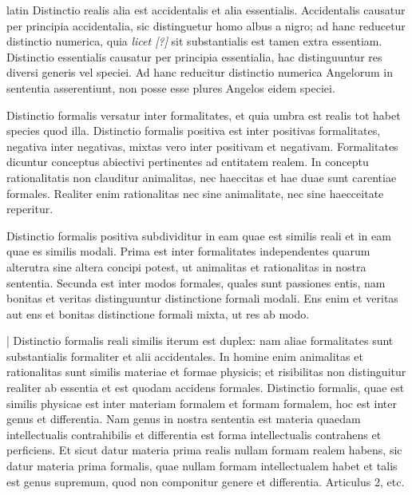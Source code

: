 \begin{otherlanguage*}{latin}
\pstart
 Distinctio realis alia est accidentalis et alia essentialis. Accidentalis causatur per principia accidentalia, sic distinguetur homo albus a nigro; ad hanc reducetur distinctio numerica, quia \emph{licet [?]} sit substantialis est tamen extra essentiam. Distinctio essentialis causatur per principia essentialia, hac distinguuntur res diversi generis vel speciei. Ad hanc reducitur distinctio numerica Angelorum in sententia asserentiunt, non posse esse plures Angelos eidem speciei. 
\pend

\pstart
 Distinctio formalis versatur inter formalitates, et quia umbra est realis tot habet species quod illa. Distinctio formalis positiva est inter positivas formalitates, negativa inter negativas, mixtas vero inter positivam et negativam. Formalitates dicuntur conceptus abiectivi pertinentes ad entitatem realem. In conceptu rationalitatis non clauditur animalitas, nec haeccitas et hae duae sunt carentiae formales. Realiter enim rationalitas nec sine animalitate, nec sine haecceitate reperitur. 
\pend

\pstart
 Distinctio formalis positiva subdividitur in eam quae est similis reali et in eam quae es similis modali. Prima est inter formalitates independentes quarum alterutra sine altera concipi potest, ut animalitas et rationalitas in nostra sententia. Secunda est inter modos formales, quales sunt passiones entis, nam bonitas et veritas distinguuntur distinctione formali modali. Ens enim et veritas aut ens et bonitas distinctione formali mixta, ut res ab modo. 
\pend

\pstart
 \textnormal{|}   Distinctio formalis reali similis iterum est duplex: nam aliae formalitates sunt substantialis formaliter et alii accidentales. In homine enim animalitas et rationalitas sunt similis materiae et formae physicis; et risibilitas non distinguitur realiter ab essentia et est quodam accidens formales. Distinctio formalis, quae est similis physicae est inter materiam formalem et formam formalem, hoc est inter genus et differentia. Nam genus in nostra sententia est materia quaedam intellectualis contrahibilis et differentia est forma intellectualis contrahens et perficiens. Et sicut datur materia prima realis nullam formam realem habens, sic datur materia prima formalis, quae nullam formam intellectualem habet et talis est genus supremum, quod non componitur genere et differentia. Articulus 2, etc. 
\pend

        \pstart
        \pend
      

\end{otherlanguage*}
